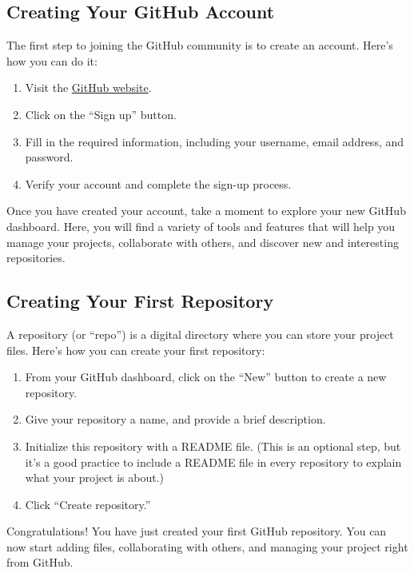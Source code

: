 \documentclass[a4paper,12pt]{book}
\begin{document}
\subsection*{Creating Your GitHub Account}

The first step to joining the GitHub community is to create an account. Here’s how you can do it:

\begin{enumerate}
    \item Visit the \href{https://github.com/}{GitHub website}.
    \item Click on the “Sign up” button.
    \item Fill in the required information, including your username, email address, and password.
    \item Verify your account and complete the sign-up process.
\end{enumerate}

Once you have created your account, take a moment to explore your new GitHub dashboard. Here, you will find a variety of tools and features that will help you manage your projects, collaborate with others, and discover new and interesting repositories.

\subsection*{Creating Your First Repository}

A repository (or “repo”) is a digital directory where you can store your project files. Here’s how you can create your first repository:

\begin{enumerate}
    \item From your GitHub dashboard, click on the “New” button to create a new repository.
    \item Give your repository a name, and provide a brief description.
    \item Initialize this repository with a README file. (This is an optional step, but it’s a good practice to include a README file in every repository to explain what your project is about.)
    \item Click “Create repository.”
\end{enumerate}

Congratulations! You have just created your first GitHub repository. You can now start adding files, collaborating with others, and managing your project right from GitHub.
\end{document}
